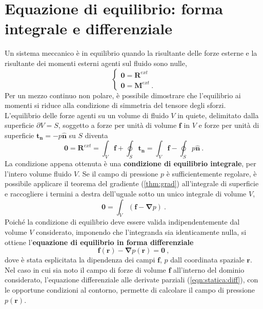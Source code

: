 \section{Equazione di equilibrio: forma integrale e differenziale}
Un sistema meccanico è in equilibrio quando la risultante delle forze esterne e la risultante dei momenti esterni agenti sul fluido sono nulle,
\begin{equation}
\begin{cases}
 \bm{0} = \bm{R}^{ext} \\
 \bm{0} = \bm{M}^{ext}  \ .
\end{cases} 
\end{equation}
 Per un mezzo continuo non polare, è possibile dimostrare che l'equilibrio ai momenti si riduce alla condizione di simmetria del tensore degli sforzi.
L'equilibrio delle forze agenti su un volume di fluido $V$ in quiete, delimitato dalla superficie $\partial V = S$, soggetto a forze per unità di volume $\bm{f}$ in $V$ e forze per unità di superficie $\bm{t_n}=-p \bm{\hat{n}}$ su $S$ diventa
\begin{equation}
 \bm{0} = \bm{R}^{ext} = \int_V \bm{f} + \oint_S \bm{t_n} = \int_V \bm{f} - \oint_S p \bm{\hat{n}} \ .
\end{equation}
La condizione appena ottenuta è una \textbf{condizione di equilibrio integrale}, per l'intero volume fluido $V$. Se il campo di pressione $p$ è sufficientemente regolare, è possibile applicare il teorema del gradiente (\ref{thm:grad}) all'integrale di superficie e raccogliere i termini a destra dell'uguale sotto un unico integrale di volume $V$,
\begin{equation}
 \bm{0} = \int_V \left( \bm{f} - \bm{\nabla} p \right) \ .
\end{equation}
Poiché la condizione di equilibrio deve essere valida indipendentemente dal volume $V$ considerato, imponendo che l'integranda sia identicamente nulla, si ottiene l'\textbf{equazione di equilibrio in forma differenziale}
\begin{equation}\label{eqn:statica:diff}
 \bm{f}(\bm{r}) - \bm{\nabla} p (\bm{r}) = \bm{0} \ ,
\end{equation}
dove è stata esplicitata la dipendenza dei campi $\bm{f}$, $p$ dall coordinata spaziale $\bm{r}$. Nel caso in cui sia noto il campo di forze di volume $\bm{f}$ all'interno del dominio considerato, l'equazione differenziale alle derivate parziali (\ref{eqn:statica:diff}), con le opportune condizioni al contorno, permette di calcolare il campo di pressione $p(\bm{r})$. 

